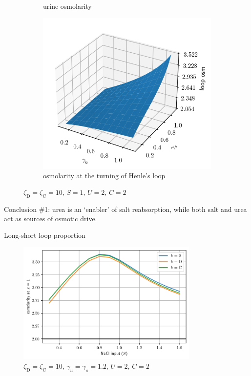 \documentclass{beamer}
\begin{document}
\begin{frame}
\begin{figure}
\begin{subfigure}{0.4\textwidth}
        \caption{urine osmolarity}
        \label{fig:urine_osm}
    \end{subfigure}
    \begin{subfigure}{0.4\textwidth}
        \centering
        \includegraphics[width=\linewidth]{../results/7-20-2023/loop_osm.png}
        \caption{osmolarity at the turning of Henle's loop}
        \label{fig:loop_osm}
    \end{subfigure}
    \caption{$\zeta_\mathrm{D} = \zeta_\mathrm{C} = 10$, $S = 1$, $U = 2$, $C = 2$}
    \label{fig:pap_osm}
\end{figure}
\end{frame}

\begin{frame}
    Conclusion \#1: urea is an `enabler' of salt reabsorption, while both salt and urea act as sources of osmotic drive.
\end{frame}

\begin{frame}{Long-short loop proportion}
    \begin{figure}
        \centering
        \includegraphics[width=0.8\textwidth]{../results/7-20-2023/osm_loop_fraction.png}
        \caption{$\zeta_\mathrm{D} = \zeta_\mathrm{C} = 10$, $\gamma_u = \gamma_s = 1.2$, $U = 2$, $C = 2$}
        \label{fig:loop_frac}
    \end{figure}
\end{frame}

\begin{frame}[allowframebreaks]
    
    \tiny
\end{frame}
\end{document}

